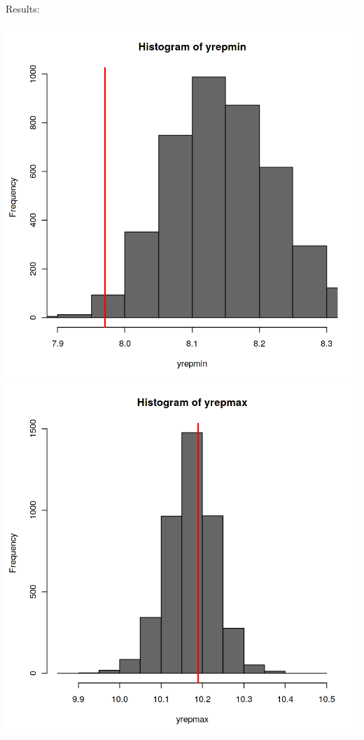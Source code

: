 \documentclass[12pt,a4paper]{article}
\begin{document}
\begin{enumerate}[(a)]
Results:

\includegraphics[scale=0.17]{./images/1_Figure6_predictive_0.png}
\includegraphics[scale=0.17]{./images/1_Figure6_predictive_1.png}

\end{enumerate}
\end{document}
